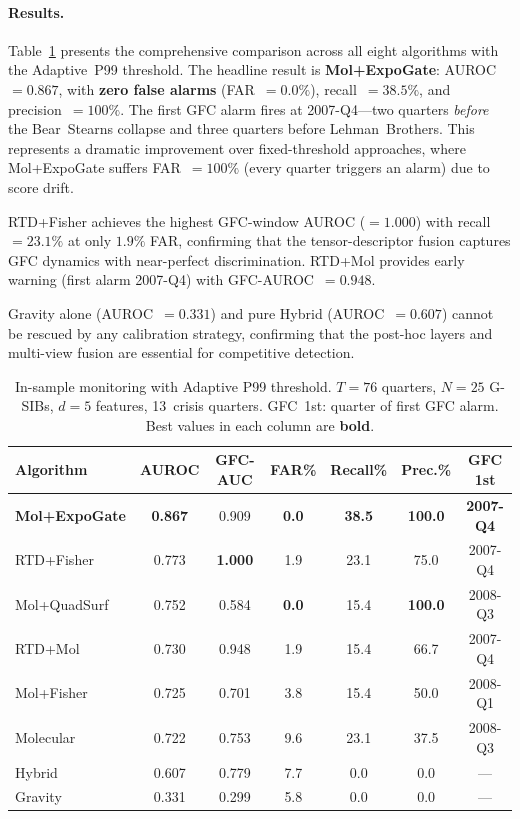 \documentclass[final]{siamltex}
\begin{document}
\paragraph{Results.}
Table~\ref{tab:calibrated} presents the comprehensive comparison
across all eight algorithms with the Adaptive~P99 threshold.  The
headline result is \textbf{Mol+ExpoGate}: AUROC~$= 0.867$, with
\textbf{zero false alarms} (FAR~$= 0.0\%$), recall~$= 38.5\%$, and
precision~$= 100\%$.  The first GFC alarm fires at 2007-Q4---two
quarters \emph{before} the Bear~Stearns collapse and three quarters
before Lehman~Brothers.  This represents a dramatic improvement over
fixed-threshold approaches, where Mol+ExpoGate suffers
FAR~$= 100\%$ (every quarter triggers an alarm) due to score drift.

RTD+Fisher achieves the highest GFC-window AUROC ($= 1.000$) with
recall~$= 23.1\%$ at only $1.9\%$ FAR, confirming that the
tensor-descriptor fusion captures GFC dynamics with near-perfect
discrimination.  RTD+Mol provides early warning (first alarm
2007-Q4) with GFC-AUROC~$= 0.948$.

Gravity alone (AUROC~$= 0.331$) and pure Hybrid (AUROC~$= 0.607$)
cannot be rescued by any calibration strategy, confirming that
the post-hoc layers and multi-view fusion are essential for
competitive detection.

\begin{table}[htbp]
\centering
\caption{In-sample monitoring with Adaptive P99 threshold.
  $T{=}76$ quarters, $N{=}25$ G-SIBs, $d{=}5$ features,
  13~crisis quarters.  GFC~1st: quarter of first GFC alarm.
  Best values in each column are \textbf{bold}.}
\label{tab:calibrated}
\begin{tabular}{@{}lcccccc@{}}
\toprule
Algorithm & AUROC & GFC-AUC & FAR\% & Recall\% & Prec.\% & GFC 1st\\
\midrule
\textbf{Mol+ExpoGate} & \textbf{0.867} & 0.909 & \textbf{0.0} & \textbf{38.5} & \textbf{100.0} & \textbf{2007-Q4}\\
RTD+Fisher & 0.773 & \textbf{1.000} & 1.9 & 23.1 & 75.0 & 2007-Q4\\
Mol+QuadSurf & 0.752 & 0.584 & \textbf{0.0} & 15.4 & \textbf{100.0} & 2008-Q3\\
RTD+Mol & 0.730 & 0.948 & 1.9 & 15.4 & 66.7 & 2007-Q4\\
Mol+Fisher & 0.725 & 0.701 & 3.8 & 15.4 & 50.0 & 2008-Q1\\
Molecular & 0.722 & 0.753 & 9.6 & 23.1 & 37.5 & 2008-Q3\\
Hybrid & 0.607 & 0.779 & 7.7 & 0.0 & 0.0 & ---\\
Gravity & 0.331 & 0.299 & 5.8 & 0.0 & 0.0 & ---\\
\bottomrule
\end{tabular}
\end{table}
\end{document}
